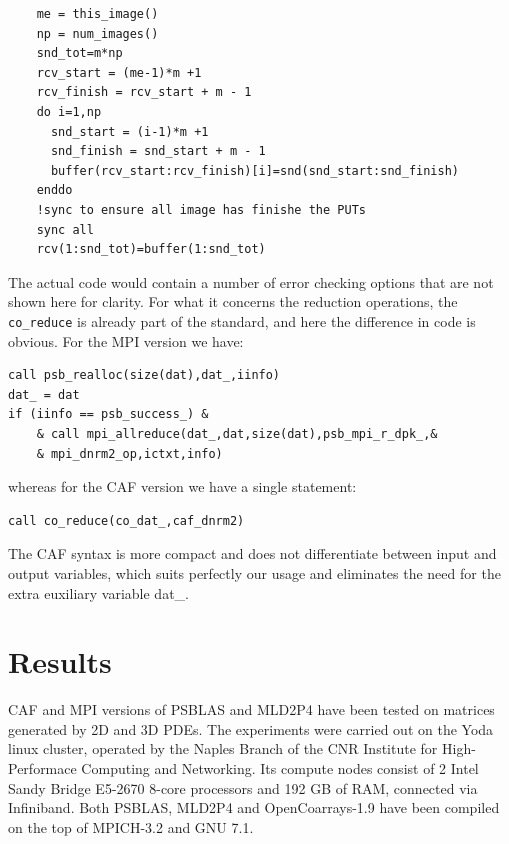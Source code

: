 \documentclass{IOS-Book-Article}
\begin{document}
\else
{\small
\begin{lstlisting}
    me = this_image()
    np = num_images()
    snd_tot=m*np
    rcv_start = (me-1)*m +1
    rcv_finish = rcv_start + m - 1
    do i=1,np
      snd_start = (i-1)*m +1 
      snd_finish = snd_start + m - 1
      buffer(rcv_start:rcv_finish)[i]=snd(snd_start:snd_finish)
    enddo
    !sync to ensure all image has finishe the PUTs 
    sync all
    rcv(1:snd_tot)=buffer(1:snd_tot)
\end{lstlisting}}
\fi
The actual code would contain a number of error checking options that
are not shown here for clarity.
For what it concerns the reduction operations, the \verb|co_reduce| is
already part of the standard, and here the difference in code is
obvious. For the  MPI version we have:
\begin{center}
{\small
\begin{lstlisting}
call psb_realloc(size(dat),dat_,iinfo)
dat_ = dat
if (iinfo == psb_success_) &
    & call mpi_allreduce(dat_,dat,size(dat),psb_mpi_r_dpk_,&
    & mpi_dnrm2_op,ictxt,info)

\end{lstlisting}}
\end{center}
whereas for  the CAF version we have a single statement: 
\begin{center}
{\small
\begin{lstlisting}
call co_reduce(co_dat_,caf_dnrm2)
\end{lstlisting}}
\end{center}
The CAF syntax is more compact and does not differentiate between
input and output variables, which suits perfectly our usage and
eliminates the need for  the extra euxiliary variable dat\_. 



\section{Results}
CAF and MPI versions of PSBLAS and MLD2P4 have been tested on matrices
generated by 2D and 3D PDEs. 
The experiments were carried out on the Yoda linux cluster, operated
by the Naples Branch of the CNR Institute for High-Performace
Computing and Networking. Its compute nodes consist of 2 Intel Sandy
Bridge E5-2670 8-core processors and 192 GB of RAM, connected via
Infiniband. 
Both PSBLAS, MLD2P4 and OpenCoarrays-1.9 have been compiled on the top
of MPICH-3.2 and GNU 7.1. 
\end{document}
